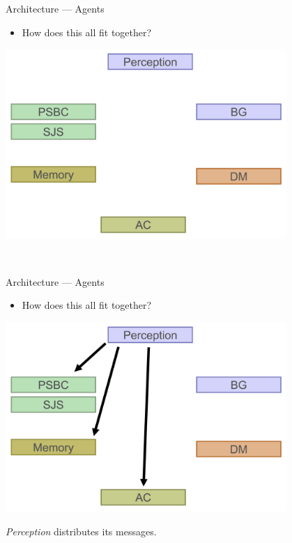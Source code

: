 \documentclass{beamer}
\begin{document}
   \begin{frame}{Architecture --- Agents}
      \begin{itemize}
         \item {How does this all fit together?}
      \end{itemize}
      
      \begin{center}
         \includegraphics[width=0.8\textwidth]{plan_0.png}
      \end{center}
      
      ~
   \end{frame}
   
   \begin{frame}{Architecture --- Agents}
      \begin{itemize}
         \item {How does this all fit together?}
      \end{itemize}
      
      \begin{center}
         \includegraphics[width=0.8\textwidth]{plan_1.png}
      \end{center}
      
      \emph{Perception} distributes its messages.
   \end{frame}
   
\end{document}

